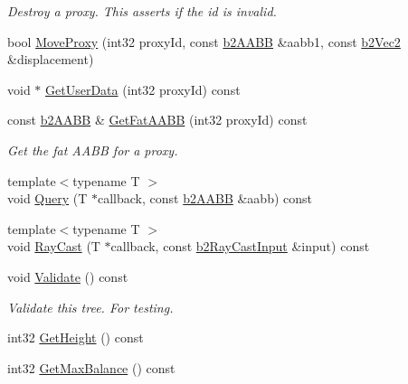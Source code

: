 \begin{DoxyCompactItemize}
\begin{DoxyCompactList}\small\item\em Destroy a proxy. This asserts if the id is invalid. \end{DoxyCompactList}\item 
bool \hyperlink{classb2_dynamic_tree_a7748252811f3c575015931399cbe4daa}{Move\+Proxy} (int32 proxy\+Id, const \hyperlink{structb2_a_a_b_b}{b2\+A\+A\+BB} \&aabb1, const \hyperlink{structb2_vec2}{b2\+Vec2} \&displacement)
\item 
void $\ast$ \hyperlink{classb2_dynamic_tree_aa8399f9440707780f267696098e8b920}{Get\+User\+Data} (int32 proxy\+Id) const
\item 
\mbox{\label{classb2_dynamic_tree_a655b9ddff43e4e0a34a372eddc03ecb9}} 
const \hyperlink{structb2_a_a_b_b}{b2\+A\+A\+BB} \& \hyperlink{classb2_dynamic_tree_a655b9ddff43e4e0a34a372eddc03ecb9}{Get\+Fat\+A\+A\+BB} (int32 proxy\+Id) const
\begin{DoxyCompactList}\small\item\em Get the fat A\+A\+BB for a proxy. \end{DoxyCompactList}\item 
{\footnotesize template$<$typename T $>$ }\\void \hyperlink{classb2_dynamic_tree_a324df3eb65dfc22d3dcdca387737b193}{Query} (T $\ast$callback, const \hyperlink{structb2_a_a_b_b}{b2\+A\+A\+BB} \&aabb) const
\item 
{\footnotesize template$<$typename T $>$ }\\void \hyperlink{classb2_dynamic_tree_aebd2dc6ee462e0cd0763a5f472243a13}{Ray\+Cast} (T $\ast$callback, const \hyperlink{structb2_ray_cast_input}{b2\+Ray\+Cast\+Input} \&input) const
\item 
\mbox{\label{classb2_dynamic_tree_ae9b989f0c04e38f9c940623d4e1728b9}} 
void \hyperlink{classb2_dynamic_tree_ae9b989f0c04e38f9c940623d4e1728b9}{Validate} () const
\begin{DoxyCompactList}\small\item\em Validate this tree. For testing. \end{DoxyCompactList}\item 
int32 \hyperlink{classb2_dynamic_tree_ae3c7dc771d596f1f95fd3a3d7f2f3e97}{Get\+Height} () const
\item 
int32 \hyperlink{classb2_dynamic_tree_a3feab170229e0acd17f6a4ad3fca406e}{Get\+Max\+Balance} () const

\end{DoxyCompactItemize}

